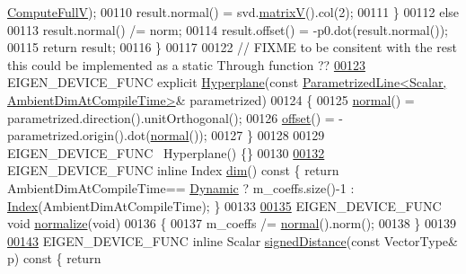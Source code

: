 \begin{DoxyCode}
      \hyperlink{group__enums_ggae3e239fb70022eb8747994cf5d68b4a9a52c6f7e80bbf9a42297c88f700245b51}{ComputeFullV});
00110       result.normal() = svd.\hyperlink{group___s_v_d___module_a245a453b5e7347f737295c23133238c4}{matrixV}().col(2);
00111     \}
00112     \textcolor{keywordflow}{else}
00113       result.normal() /= norm;
00114     result.offset() = -p0.dot(result.normal());
00115     \textcolor{keywordflow}{return} result;
00116   \}
00117 
00122   \textcolor{comment}{// FIXME to be consitent with the rest this could be implemented as a static Through function ??}
\hyperlink{group___geometry___module_ab0096b58dd2a7d4e5c5d66e824c3b657}{00123}   EIGEN\_DEVICE\_FUNC \textcolor{keyword}{explicit} \hyperlink{group___geometry___module_ab0096b58dd2a7d4e5c5d66e824c3b657}{Hyperplane}(\textcolor{keyword}{const} 
      \hyperlink{group___geometry___module_class_eigen_1_1_parametrized_line}{ParametrizedLine<Scalar, AmbientDimAtCompileTime>}& 
      parametrized)
00124   \{
00125     \hyperlink{group___geometry___module_ad3da930fc7025604f2f174651089b2a8}{normal}() = parametrized.direction().unitOrthogonal();
00126     \hyperlink{group___geometry___module_afe2eadf3679e4a802c0e02c15049aed9}{offset}() = -parametrized.origin().dot(\hyperlink{group___geometry___module_ad3da930fc7025604f2f174651089b2a8}{normal}());
00127   \}
00128 
00129   EIGEN\_DEVICE\_FUNC ~Hyperplane() \{\}
00130 
\hyperlink{group___geometry___module_a44f0dab75a838cdadf1df9150648b8ed}{00132}   EIGEN\_DEVICE\_FUNC \textcolor{keyword}{inline} Index \hyperlink{group___geometry___module_a44f0dab75a838cdadf1df9150648b8ed}{dim}()\textcolor{keyword}{ const }\{ \textcolor{keywordflow}{return} AmbientDimAtCompileTime==
      \hyperlink{namespace_eigen_ad81fa7195215a0ce30017dfac309f0b2}{Dynamic} ? m\_coeffs.size()-1 : \hyperlink{group___geometry___module_a58d2307d16128a0026021374e9e10465}{Index}(AmbientDimAtCompileTime); \}
00133 
\hyperlink{group___geometry___module_ac12d2a82db8f058f01b2de92d55a65e6}{00135}   EIGEN\_DEVICE\_FUNC \textcolor{keywordtype}{void} \hyperlink{group___geometry___module_ac12d2a82db8f058f01b2de92d55a65e6}{normalize}(\textcolor{keywordtype}{void})
00136   \{
00137     m\_coeffs /= \hyperlink{group___geometry___module_ad3da930fc7025604f2f174651089b2a8}{normal}().norm();
00138   \}
00139 
\hyperlink{group___geometry___module_a928f4f8a7c2eb339fe8c931824d0a8c8}{00143}   EIGEN\_DEVICE\_FUNC \textcolor{keyword}{inline} Scalar \hyperlink{group___geometry___module_a928f4f8a7c2eb339fe8c931824d0a8c8}{signedDistance}(\textcolor{keyword}{const} VectorType& p)\textcolor{keyword}{ const }\{ \textcolor{keywordflow}{return} 

\end{DoxyCode}
